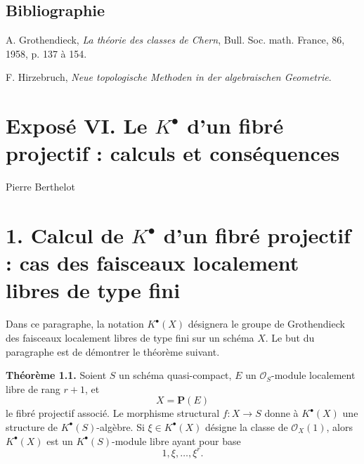 \documentclass[11pt]{article}
\newcommand{\Spec}{\operatorname{Spec}}
\begin{document}
\subsection*{Bibliographie}
\begin{enumerate}[label={[\arabic*]}]
\item A. Grothendieck, \emph{La théorie des classes de Chern}, Bull. Soc. math. France, 86, 1958, p. 137 à 154.
\item F. Hirzebruch, \emph{Neue topologische Methoden in der algebraischen Geometrie}.
\end{enumerate}



\providecommand{\Sym}{\operatorname{Sym}}
\providecommand{\Proj}{\operatorname{Proj}}
\providecommand{\Projz}{\operatorname{Proj}_0}
\providecommand{\Spec}{\operatorname{Spec}}
\providecommand{\Comp}{\operatorname{Comp}}
\providecommand{\Dplus}{D_{+}}
\providecommand{\id}{\operatorname{id}}
\providecommand{\cG}{\mathcal G}
\providecommand{\cA}{\mathcal A}
\providecommand{\cB}{\mathcal B}
\providecommand{\cL}{\mathscr L}
\providecommand{\cM}{\mathscr M}
\providecommand{\cN}{\mathscr N}
\providecommand{\cE}{\mathscr E}
\providecommand{\cK}{\mathscr K}
\providecommand{\cP}{\mathscr P}
\providecommand{\cQ}{\mathscr Q}
\providecommand{\OO}{\mathcal O}
\providecommand{\rk}{\operatorname{rk}}
\providecommand{\colim}{\operatorname*{colim}}


\section*{Exposé VI. Le \(K^\bullet\) d'un fibré projectif : calculs et conséquences}
\begin{center}
Pierre Berthelot
\end{center}

\section*{1. Calcul de \(K^\bullet\) d'un fibré projectif : cas des faisceaux localement libres de type fini}

Dans ce paragraphe, la notation \(K^\bullet(X)\) désignera le groupe de Grothendieck des faisceaux localement libres de type fini sur un schéma \(X\). Le but du paragraphe est de démontrer le théorème suivant.

\textbf{Théorème 1.1.} Soient \(S\) un schéma quasi-compact, \(E\) un \(\mathcal O_S\)-module localement libre de rang \(r+1\), et
\[
  X=\mathbf P(E)
\]
le fibré projectif associé. Le morphisme structural \(f:X\to S\) donne à \(K^\bullet(X)\) une structure de \(K^\bullet(S)\)-algèbre. Si \(\xi\in K^\bullet(X)\) désigne la classe de \(\mathcal O_X(1)\), alors \(K^\bullet(X)\) est un \(K^\bullet(S)\)-module libre ayant pour base
\[
  1,\xi,\ldots,\xi^r .
\]
\end{document}
